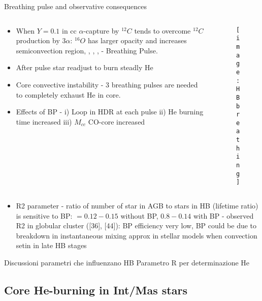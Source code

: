 \begin{frame}{Breathing pulse and observative consequences}
\begin{columns}[T]
	\begin{column}{0.4\textwidth}
	\begin{itemize}
        \item When $Y=0.1$ in cc $\alpha$-capture by $^{12}C$ tends to overcome $^{12}C$ production by $3\alpha$: $^{16}O$ has larger opacity and increases semiconvection region, , \xaumenta{\epsilon_{3\alpha}}, ,  - Breathing Pulse.
        \item After pulse star readjust to burn steadly He
        \item Core convective instability - 3 breathing pulses are needed to completely exhaust He in core.
	\item Effects of BP - i) Loop in HDR at each pulse ii) He burning time increased iii) $M_{cc}$ CO-core increased
	\end{itemize}
	\end{column}
	\begin{column}{0.50\textwidth}
	\begin{figure}[!ht]
	\texttt{[image: HBbreathing]}\label{fig:HBbreathing}
	\end{figure}
\end{column}\end{columns}
	\begin{itemize}
	\item R2 parameter - ratio of number of star in AGB to stars in HB (lifetime ratio) is sensitive to BP: $=0.12-0.15$ without BP, $0.8-0.14$ with BP - observed R2 in globular cluster ([36], [44]): BP efficiency very low, BP could be due to breakdown in instantaneous mixing approx in stellar models when convection setin in late HB stages
\end{itemize}
\end{frame}

\begin{frame}{Discussioni parametri che influenzano HB}
Parametro R per determinazione He
\end{frame}

\subsection{Core He-burning in Int/Mas stars}

